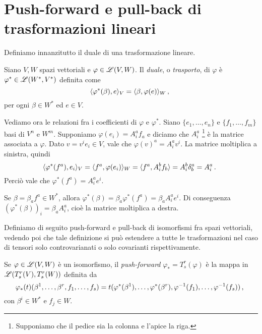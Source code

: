 \section{Push-forward e pull-back di trasformazioni lineari}

Definiamo innanzitutto il duale di una trasformazione lineare.
\begin{definition}   
	Siano $V,W$ spazi vettoriali e $\varphi \in \mathscr L(V,W)$. Il \emph{duale}, o \emph{trasporto}, di $\varphi$ è $\varphi^* \in \mathscr L(W^*,V^*)$ definita come 
	\begin{equation*}
		\Scal{\varphi^*(\beta)}{e}_V = \Scal{\beta}{\varphi(e)}_W \virgola %
	\end{equation*}
	per ogni $\beta \in W^*$ ed $e\in V$.
\end{definition}

Vediamo ora le relazioni fra i coefficienti di $\varphi$ e $\varphi^*$.
Siano $\{e_1,\ldots, e_n\}$ e $\{f_1,\ldots, f_m\}$ basi di $V^n$ e $W^m$. Supponiamo $\varphi(e_i) = A_i^af_a$ e diciamo che $A_i^a$ \footnote{Supponiamo che il pedice sia la colonna e l'apice la riga.} è la matrice associata a $\varphi$.
Dato $v = v^ie_i\in V$, vale che $\varphi(v)^a = A_i^a v^i$.
La matrice moltiplica a sinistra, quindi
\begin{equation*}
	\langle \varphi^*(f^a) , e_i \rangle_V = \langle f^a , \varphi(e_i) \rangle_W = \langle f^a , A_i^b f_b \rangle = A_i^b\delta_b^a = A_i^a\, \text{. }
\end{equation*}
Perciò vale che $\varphi^*(f^a) = A_i^a e^i$.

Se $\beta = \beta_a f^a \in W^*$, allora $\varphi^*(\beta) = \beta_a \varphi^*(f^a) = \beta_aA_i^ae^i$.
Di conseguenza $(\varphi^*(\beta))_i = \beta_aA_i^a$, cioè la matrice moltiplica a destra.


Definiamo di seguito push-forward e pull-back di isomorfismi fra spazi vettoriali, vedendo poi che tale definizione si può estendere a tutte le trasformazioni nel caso di tensori solo controvarianati o solo covarianti rispettivamente.

\begin{definition} 
	Se $\varphi \in \mathscr L(V,W)$ è un isomorfismo, il \emph{push-forward} $\varphi_* = T_s^r(\varphi)$ è la mappa in $\mathscr L(T_s^r(V), T_s^r(W))$ definita da
	\begin{equation*}
		\varphi_*(t) (\beta^1,\ldots,\beta^r,f_1,\ldots,f_s) = t(\varphi^*(\beta^1),\ldots,\varphi^*(\beta^r), \varphi^{-1}(f_1),\ldots, \varphi^{-1}(f_s)) \, \text{, }
	\end{equation*}
	con $\beta^i\in W^*$ e $f_j\in W$.
\end{definition}


